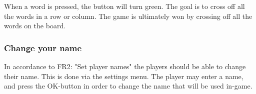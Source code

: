When a word is pressed, the button will turn green. The goal is to cross off all the words in a row or column. The game is ultimately won by crossing off all the words on the board. 

\begin{center}
\end{center}

\begin{center}
\end{center}



\subsubsection{Change your name}
In accordance to FR2: "Set player names" the players should be able to change their name. This is done via the settings menu. The player may enter a name, and press the OK-button in order to change the name that will be used in-game.

\begin{center}
\end{center}